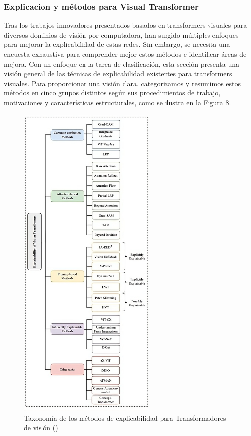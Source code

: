  \subsubsection{ Explicacion y métodos para Visual Transformer} 
 Tras los trabajos innovadores presentados basados en transformers visuales para diversos dominios de visión por computadora, han surgido múltiples enfoques para mejorar la explicabilidad de estas redes. Sin embargo, se necesita una encuesta exhaustiva para comprender mejor estos métodos e identificar áreas de mejora. Con un enfoque en la tarea de clasificación, esta sección presenta una visión general de las técnicas de explicabilidad existentes para transformers visuales. Para proporcionar una visión clara, categorizamos y resumimos estos métodos en cinco grupos distintos según sus procedimientos de trabajo, motivaciones y características estructurales, como se ilustra en la Figura 8.
    \begin{figure}[H]
  	\begin{center}
  		\includegraphics[width=0.6\textwidth]{2/figures/vt2.jpeg}
  		\caption{ Taxonomía de los métodos de explicabilidad para
  			Transformadores de visión (\cite{tecnica1})}
  	\end{center}
  \end{figure}
  
